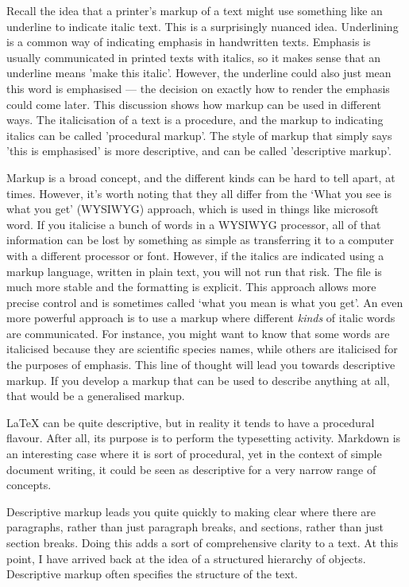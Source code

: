 \documentclass[12pt, oneside]{memoir}
\begin{document}
Recall the idea that a printer's markup of a text might use something like an underline to indicate italic text. This is a surprisingly nuanced idea. Underlining is a common way of indicating emphasis in handwritten texts. Emphasis is usually communicated in printed texts with italics, so it makes sense that an underline means 'make this italic'. However, the underline could also just mean this word is emphasised — the decision on exactly how to render the emphasis could come later. This discussion shows how markup can be used in different ways. The italicisation of a text is a procedure, and the markup to indicating italics can be called 'procedural markup'. The style of markup that simply says 'this is emphasised' is more descriptive, and can be called 'descriptive markup'.

Markup is a broad concept, and the different kinds can be hard to tell apart, at times. However, it's worth noting that they all differ from the `What you see is what you get' (WYSIWYG) approach, which is used in things like microsoft word. If you italicise a bunch of words in a WYSIWYG processor, all of that information can be lost by something as simple as transferring it to a computer with a different processor or font. However, if the italics are indicated using a markup language, written in plain text, you will not run that risk. The file is much more stable and the formatting is explicit. This approach allows more precise control and is sometimes called `what you mean is what you get'. An even more powerful approach is to use a markup where different \emph{kinds} of italic words are communicated. For instance, you might want to know that some words are italicised because they are scientific species names, while others are italicised for the purposes of emphasis. This line of thought will lead you towards descriptive markup. If you develop a markup that can be used to describe anything at all, that would be a generalised markup.

\LaTeX{} can be quite descriptive, but in reality it tends to have a procedural flavour. After all, its purpose is to perform the typesetting activity. Markdown is an interesting case where it is sort of procedural, yet in the context of simple document writing, it could be seen as descriptive for a very narrow range of concepts.

Descriptive markup leads you quite quickly to making clear where there are paragraphs, rather than just paragraph breaks, and sections, rather than just section breaks. Doing this adds a sort of comprehensive clarity to a text. At this point, I have arrived back at the idea of a structured hierarchy of objects. Descriptive markup often specifies the structure of the text. 
\end{document}
